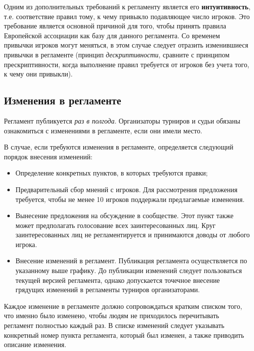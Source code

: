 Одним из дополнительных требований к регламенту является его \textbf{интуитивность}, т.е. соответствие правил тому, к чему привыкло подавляющее число игроков. Это требование является основной причиной для того, чтобы принять правила Европейской ассоциации как базу для данного регламента. Со временем привычки игроков могут меняться, в этом случае следует отразить изменившиеся привычки в регламенте (принцип \textit{дескриптивности}, сравните с принципом прескриптивности, когда выполнение правил требуется от игроков без учета того, к чему они привыкли).

\subsection{Изменения в регламенте}

Регламент публикуется \textit{раз в полгода}. Организаторы турниров и судьи обязаны ознакомиться с изменениями в регламенте, если они имели место.

В случае, если требуются изменения в регламенте, определяется следующий порядок внесения изменений:
\begin{itemize}
	\item Определение конкретных пунктов, в которых требуются правки;
	\item Предварительный сбор мнений с игроков. Для рассмотрения предложения требуется, чтобы не менее 10 игроков поддержали предлагаемые изменения.
	\item Вынесение предложения на обсуждение в сообществе. Этот пункт также может предполагать голосование всех заинтересованных лиц. Круг заинтересованных лиц не регламентируется и принимаются доводы от любого игрока.
	\item Внесение изменений в регламент. Публикация регламента осуществляется по указанному выше графику. До публикации изменений следует пользоваться текущей версией регламента, однако допускается точечное внесение грядущих изменений в регламенты турниров организаторами.
\end{itemize}

Каждое изменение в регламенте должно сопровождаться кратким списком того, что именно было изменено, чтобы людям не приходилось перечитывать регламент полностью каждый раз. В списке изменений следует указывать конкретный номер пункта регламента, который был изменен, а также приводить описание изменения.
